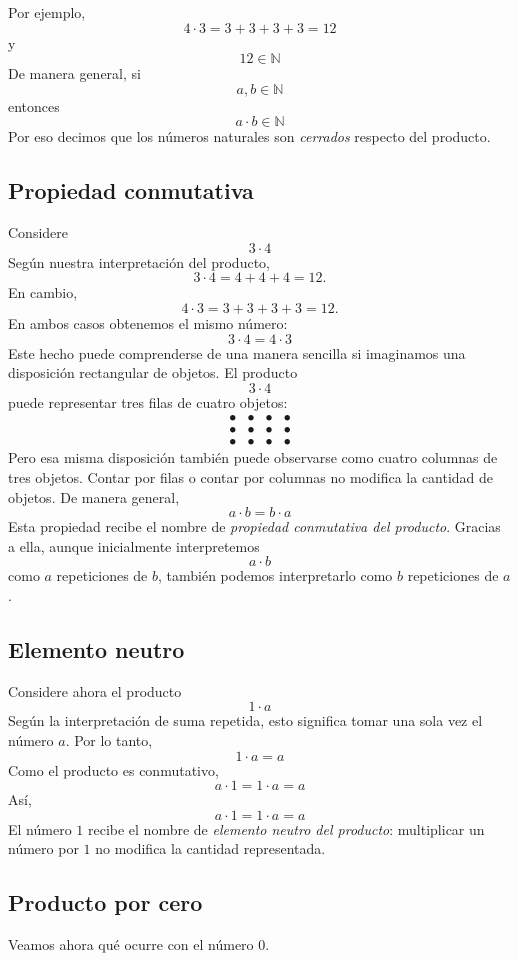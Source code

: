 Por ejemplo,
\[
4\cdot3
=
3+3+3+3
=
12
\]
y
\[
12\in\mathbb{N}
\]
De manera general, si
\[
a,b\in\mathbb{N}
\]
entonces
\[
a\cdot b\in\mathbb{N}
\]
Por eso decimos que los números naturales son \emph{cerrados} respecto del producto.

\subsection{Propiedad conmutativa}

Considere
\[
3\cdot4
\]
Según nuestra interpretación del producto,
\[
3\cdot4
=
4+4+4
=
12.
\]
En cambio,
\[
4\cdot3
=
3+3+3+3
=
12.
\]
En ambos casos obtenemos el mismo número:
\[
3\cdot4=4\cdot3
\]
Este hecho puede comprenderse de una manera sencilla si imaginamos una disposición rectangular de objetos. El producto
\[
3\cdot4
\]
puede representar tres filas de cuatro objetos:
\[
\begin{array}{cccc}
\bullet&\bullet&\bullet&\bullet\\
\bullet&\bullet&\bullet&\bullet\\
\bullet&\bullet&\bullet&\bullet
\end{array}
\]
Pero esa misma disposición también puede observarse como cuatro columnas de tres objetos. Contar por filas o contar por columnas no modifica la cantidad de objetos.
De manera general,
\[
a\cdot b=b\cdot a
\]
Esta propiedad recibe el nombre de \emph{propiedad conmutativa del producto}.
Gracias a ella, aunque inicialmente interpretemos
\[
a\cdot b
\]
como \(a\) repeticiones de \(b\), también podemos interpretarlo como \(b\) repeticiones de \(a\).

\subsection{Elemento neutro}

Considere ahora el producto
\[
1\cdot a
\]
Según la interpretación de suma repetida, esto significa tomar una sola vez el número \(a\). Por lo tanto,
\[
1\cdot a=a
\]
Como el producto es conmutativo,
\[
a\cdot1=1\cdot a=a
\]
Así,
\[
a\cdot1=1\cdot a=a
\]
El número \(1\) recibe el nombre de \emph{elemento neutro del producto}: multiplicar un número por \(1\) no modifica la cantidad representada.

\subsection{Producto por cero}

Veamos ahora qué ocurre con el número \(0\).

